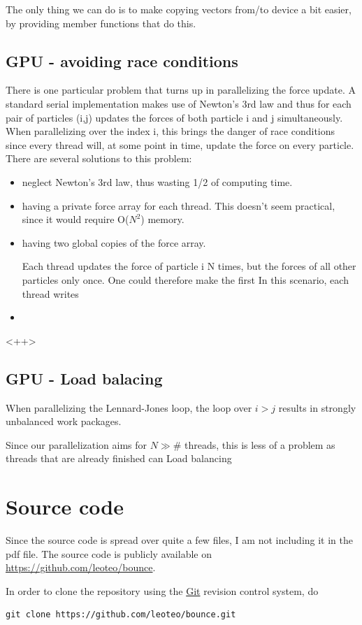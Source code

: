 \documentclass{scrartcl}
\begin{document}
The only thing we can do is to make copying vectors from/to device
a bit easier, by providing member functions that do this.

\subsection{GPU - avoiding race conditions}


There is one particular problem that turns up in parallelizing
the force update. 
A standard serial implementation makes use of Newton's 3rd law
and thus for each pair of particles (i,j) updates the forces of both
particle i and j simultaneously.
When parallelizing over the index i,
this brings the danger of race conditions 
since every thread will, at some point in time, 
update the force on every particle.
There are several solutions to this problem:
\begin{itemize}
    \item neglect Newton's 3rd law, thus wasting 1/2 of computing time.
    \item having a private force array for each thread. 
        This doesn't seem practical, since it would require O($N^2$) memory.
    \item having two global copies of the force array.

        Each thread updates the force of particle i N times, but the forces of
        all other particles only once. One could therefore make the first
        In this scenario, each thread writes
    \item 
\end{itemize}<++>

\subsection{GPU - Load balacing}
When parallelizing the Lennard-Jones loop,
the loop over $i>j$ results in strongly unbalanced work packages.

Since our parallelization aims for $N\gg \#$ threads,
this is less of a problem as threads that are already finished
can 
Load balancing




\section{Source code}

Since the source code is spread over quite a few files,
I am not including it in the pdf file.
The source code is publicly available on
\url{https://github.com/leoteo/bounce}.

In order to clone the repository using the \href{http://git-scm.com}{Git} 
revision control system, do

\begin{verbatim}
git clone https://github.com/leoteo/bounce.git
\end{verbatim}
\end{document}
